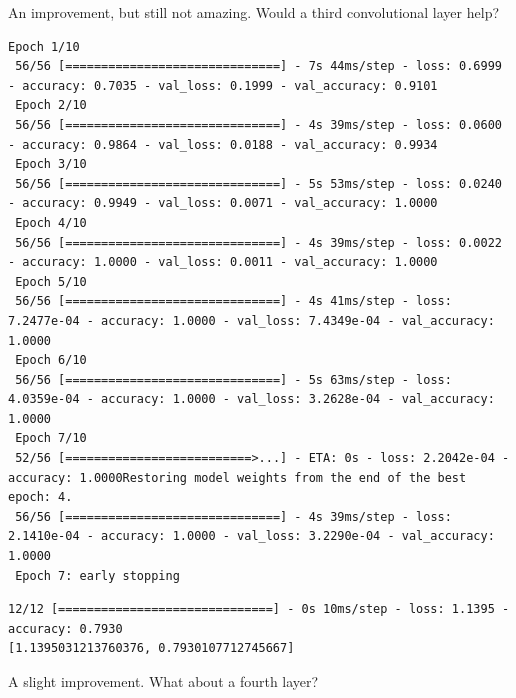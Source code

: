 \documentclass{article}
\begin{document}
An improvement, but still not amazing. Would a third convolutional layer help?




\begin{lstlisting}[style=output]
 Epoch 1/10
 56/56 [==============================] - 7s 44ms/step - loss: 0.6999 - accuracy: 0.7035 - val_loss: 0.1999 - val_accuracy: 0.9101
 Epoch 2/10
 56/56 [==============================] - 4s 39ms/step - loss: 0.0600 - accuracy: 0.9864 - val_loss: 0.0188 - val_accuracy: 0.9934
 Epoch 3/10
 56/56 [==============================] - 5s 53ms/step - loss: 0.0240 - accuracy: 0.9949 - val_loss: 0.0071 - val_accuracy: 1.0000
 Epoch 4/10
 56/56 [==============================] - 4s 39ms/step - loss: 0.0022 - accuracy: 1.0000 - val_loss: 0.0011 - val_accuracy: 1.0000
 Epoch 5/10
 56/56 [==============================] - 4s 41ms/step - loss: 7.2477e-04 - accuracy: 1.0000 - val_loss: 7.4349e-04 - val_accuracy: 1.0000
 Epoch 6/10
 56/56 [==============================] - 5s 63ms/step - loss: 4.0359e-04 - accuracy: 1.0000 - val_loss: 3.2628e-04 - val_accuracy: 1.0000
 Epoch 7/10
 52/56 [==========================>...] - ETA: 0s - loss: 2.2042e-04 - accuracy: 1.0000Restoring model weights from the end of the best epoch: 4.
 56/56 [==============================] - 4s 39ms/step - loss: 2.1410e-04 - accuracy: 1.0000 - val_loss: 3.2290e-04 - val_accuracy: 1.0000
 Epoch 7: early stopping
\end{lstlisting}



\begin{lstlisting}[style=output]
12/12 [==============================] - 0s 10ms/step - loss: 1.1395 - accuracy: 0.7930
[1.1395031213760376, 0.7930107712745667]
\end{lstlisting}

A slight improvement. What about a fourth layer?


\end{document}
